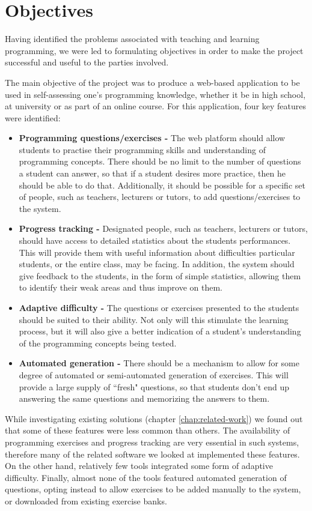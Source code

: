 \section{Objectives}
Having identified the problems associated with teaching and learning programming, we were led to formulating objectives in order to make the project successful and useful to the parties involved. \newline

The main objective of the project was to produce a web-based application to be used in self-assessing one's programming knowledge, whether it be in high school, at university or as part of an online course. For this application, four key features were identified:

\begin{itemize}
\item \textbf{Programming questions/exercises -} The web platform should allow students to practise their programming skills and understanding of programming concepts. There should be no limit to the number of questions a student can answer, so that if a student desires more practice, then he should be able to do that. Additionally, it should be possible for a specific set of people, such as teachers, lecturers or tutors, to add questions/exercises to the system.
\item \textbf{Progress tracking -} Designated people, such as teachers, lecturers or tutors, should have access to detailed statistics about the students performances. This will provide them with useful information about difficulties particular students, or the entire class, may be facing. In addition, the system should give feedback to the students, in the form of simple statistics, allowing them to identify their weak areas and thus improve on them.
\item \textbf{Adaptive difficulty -} The questions or exercises presented to the students should be suited to their ability. Not only will this stimulate the learning process, but it will also give a better indication of a student's understanding of the programming concepts being tested.
\item \textbf{Automated generation -} There should be a mechanism to allow for some degree of automated or semi-automated generation of exercises. This will provide a large supply of ``fresh" questions, so that students don't end up answering the same questions and memorizing the answers to them.
\end{itemize}

While investigating existing solutions (chapter \ref{chap:related-work}) we found out that some of these features were less common than others. The availability of programming exercises and progress tracking are very essential in such systems, therefore many of the related software we looked at implemented these features. On the other hand, relatively few tools integrated some form of adaptive difficulty. Finally, almost none of the tools featured automated generation of questions, opting instead to allow exercises to be added manually to the system, or downloaded from existing exercise banks.

